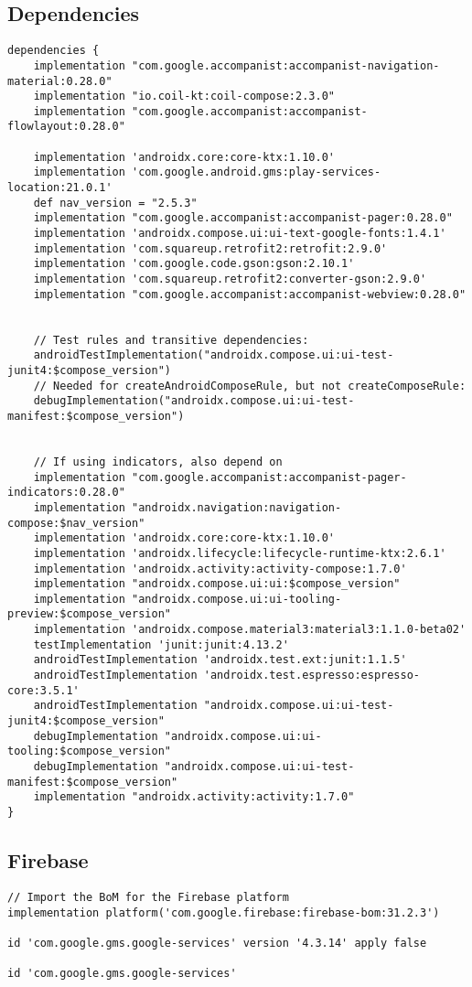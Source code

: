 \documentclass[11pt]{article}
\begin{document}
\subsection{Dependencies}
\label{sec:org57e728f}
\begin{verbatim}
dependencies {
    implementation "com.google.accompanist:accompanist-navigation-material:0.28.0"
    implementation "io.coil-kt:coil-compose:2.3.0"
    implementation "com.google.accompanist:accompanist-flowlayout:0.28.0"

    implementation 'androidx.core:core-ktx:1.10.0'
    implementation 'com.google.android.gms:play-services-location:21.0.1'
    def nav_version = "2.5.3"
    implementation "com.google.accompanist:accompanist-pager:0.28.0"
    implementation 'androidx.compose.ui:ui-text-google-fonts:1.4.1'
    implementation 'com.squareup.retrofit2:retrofit:2.9.0'
    implementation 'com.google.code.gson:gson:2.10.1'
    implementation 'com.squareup.retrofit2:converter-gson:2.9.0'
    implementation "com.google.accompanist:accompanist-webview:0.28.0"


    // Test rules and transitive dependencies:
    androidTestImplementation("androidx.compose.ui:ui-test-junit4:$compose_version")
    // Needed for createAndroidComposeRule, but not createComposeRule:
    debugImplementation("androidx.compose.ui:ui-test-manifest:$compose_version")


    // If using indicators, also depend on
    implementation "com.google.accompanist:accompanist-pager-indicators:0.28.0"
    implementation "androidx.navigation:navigation-compose:$nav_version"
    implementation 'androidx.core:core-ktx:1.10.0'
    implementation 'androidx.lifecycle:lifecycle-runtime-ktx:2.6.1'
    implementation 'androidx.activity:activity-compose:1.7.0'
    implementation "androidx.compose.ui:ui:$compose_version"
    implementation "androidx.compose.ui:ui-tooling-preview:$compose_version"
    implementation 'androidx.compose.material3:material3:1.1.0-beta02'
    testImplementation 'junit:junit:4.13.2'
    androidTestImplementation 'androidx.test.ext:junit:1.1.5'
    androidTestImplementation 'androidx.test.espresso:espresso-core:3.5.1'
    androidTestImplementation "androidx.compose.ui:ui-test-junit4:$compose_version"
    debugImplementation "androidx.compose.ui:ui-tooling:$compose_version"
    debugImplementation "androidx.compose.ui:ui-test-manifest:$compose_version"
    implementation "androidx.activity:activity:1.7.0"
}
\end{verbatim}


\subsection{Firebase}
\label{sec:org20c54f4}

\begin{verbatim}
// Import the BoM for the Firebase platform
implementation platform('com.google.firebase:firebase-bom:31.2.3')

id 'com.google.gms.google-services' version '4.3.14' apply false

id 'com.google.gms.google-services'

\end{verbatim}
\end{document}
